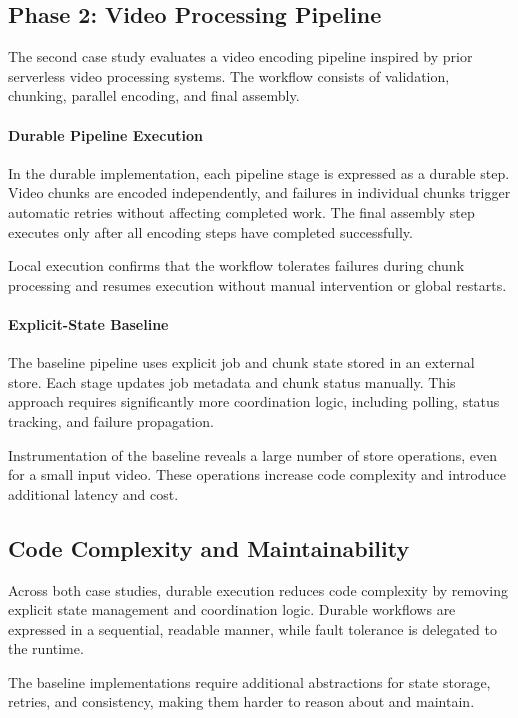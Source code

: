 \subsection{Phase 2: Video Processing Pipeline}

The second case study evaluates a video encoding pipeline inspired by prior serverless video processing systems. The workflow consists of validation, chunking, parallel encoding, and final assembly.

\paragraph{Durable Pipeline Execution}
In the durable implementation, each pipeline stage is expressed as a durable step. Video chunks are encoded independently, and failures in individual chunks trigger automatic retries without affecting completed work. The final assembly step executes only after all encoding steps have completed successfully.

Local execution confirms that the workflow tolerates failures during chunk processing and resumes execution without manual intervention or global restarts.

\paragraph{Explicit-State Baseline}
The baseline pipeline uses explicit job and chunk state stored in an external store. Each stage updates job metadata and chunk status manually. This approach requires significantly more coordination logic, including polling, status tracking, and failure propagation.

Instrumentation of the baseline reveals a large number of store operations, even for a small input video. These operations increase code complexity and introduce additional latency and cost.

\subsection{Code Complexity and Maintainability}

Across both case studies, durable execution reduces code complexity by removing explicit state management and coordination logic. Durable workflows are expressed in a sequential, readable manner, while fault tolerance is delegated to the runtime.

The baseline implementations require additional abstractions for state storage, retries, and consistency, making them harder to reason about and maintain.


